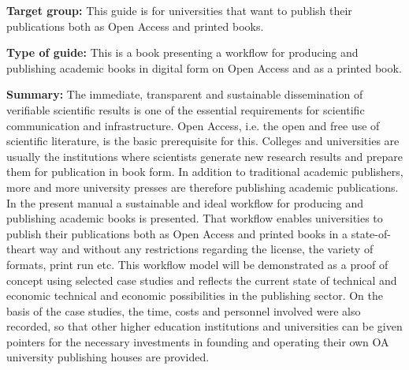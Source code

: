 \documentclass{article}
\begin{document}
\textbf{Target group: }This guide is for universities that want to publish their publications both as Open Access and printed books.


\textbf{Type of guide: }This is a book presenting a workflow for producing and publishing academic books in digital form on Open Access and as a printed book.


\textbf{Summary: }The immediate, transparent and sustainable dissemination of verifiable scientific results is one of the essential requirements for scientific communication and infrastructure. Open Access, i.e. the open and free use of scientific literature, is the basic prerequisite for this. Colleges and universities are usually the institutions where scientists generate new research results and prepare them for publication in book form. In addition to traditional academic publishers, more and more university presses are therefore publishing academic publications. In the present manual a sustainable and ideal workflow for producing and publishing academic books is presented. That workflow enables universities to publish their publications both as Open Access and printed books in a state-of-theart way and without any restrictions regarding the license, the variety of formats, print run etc. This workflow model will be demonstrated as a proof of concept using selected case studies and reflects the current state of technical and economic technical and economic possibilities in the publishing sector. On the basis of the case studies, the time, costs and personnel involved were also recorded, so that other higher education institutions and universities can be given pointers for the necessary investments in founding and operating their own OA university publishing houses are provided.


\printbibliography[title={Bibliography}]
\end{document}
